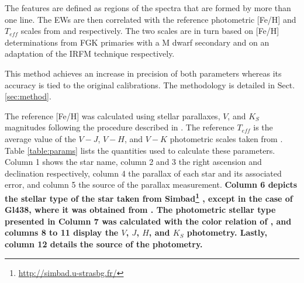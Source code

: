 \documentclass[referee]{aa}
\begin{document}
The features are defined as regions of the spectra that are formed by more than one line. The EWs are then correlated with the reference photometric [Fe/H] and $T_{eff}$ scales from \citet{Neves-2012} and \citet{Casagrande-2008} respectively. The two scales are in turn based on [Fe/H] determinations from FGK primaries with a M dwarf secondary and on an adaptation of the IRFM technique \citep{Blackwell-1977} respectively.

This method achieves an increase in precision of both parameters whereas its accuracy is tied to the original calibrations. The methodology is detailed in Sect. \ref{sec:method}. 

The reference [Fe/H] was calculated using stellar parallaxes, $V$, and $K_{S}$ magnitudes following the procedure described in \citet{Neves-2012}. The reference $T_{eff}$ is the average value of the $V-J$, $V-H$, and $V-K$ photometric scales taken from \citet{Casagrande-2008}. Table \ref{table:params} lists the quantities used to calculate these parameters. Column 1 shows the star name, column 2 and 3 the right ascension and declination respectively, column 4 the parallax of each star and its associated error, and column 5 the source of the parallax measurement. \textbf{Column 6 depicts the stellar type of the star taken from Simbad\footnote{\url{http://simbad.u-strasbg.fr/}} \citep{Wenger-2000}, except in the case of Gl438, where it was obtained from \citet{Hawley-1997}. The photometric stellar type presented in Column 7 was calculated with the color relation of \citet{Lepine-2013}, and columns 8 to 11 display the $V$, $J$, $H$, and $K_{S}$ photometry. Lastly, column 12 details the source of the photometry.} %

\end{document}
